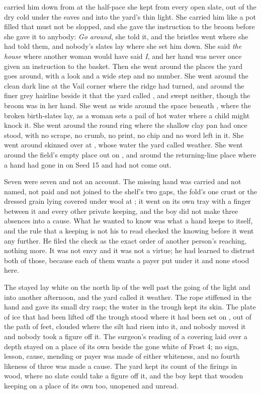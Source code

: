  carried him down from  at the half-pace she kept from every open slate, out of the dry cold under the eaves and into the yard's thin light. She carried him like a pot filled that must not be slopped, and she gave the instruction to the broom before she gave it to anybody: \emph{Go around}, she told it, and the bristles went where she had told them, and nobody's slates lay where she set him down. She said \emph{the house} where another woman would have said \emph{I}, and her hand was never once given an instruction to the basket. Then she went around the places the yard goes around, with a look and a wide step and no number. She went around the clean dark line at the Vail corner where the  ridge had turned, and around the finer grey hairline beside it that the yard called , and swept neither, though the broom was in her hand. She went as wide around the space beneath , where the broken birth-slates lay, as a woman sets a pail of hot water where a child might knock it. She went around the round ring where the shallow clay pan had once stood, with no scrape, no crumb, no print, no chip and no word left in it. She went around  skinned over at , whose water the yard called weather. She went around the field's empty place out on , and around the returning-line place where a hand had gone in on Seed 15 and had not come out.

Seven were seven and not an account. The missing hand was carried and not named, not paid and not joined to the shelf's two gaps, the fold's one crust or the dressed grain lying covered under wool at ; it went on its own tray with a finger between it and every other private keeping, and the boy did not make three absences into a cause. What he wanted to know was what a hand keeps to itself, and the rule that a keeping is not his to read checked the knowing before it went any further. He filed the check as the exact order of another person's reaching, nothing more. It was not envy and it was not a virtue; he had learned to distrust both of those, because each of them wants a payer put under it and none stood here.

The stayed  lay white on the north lip of the well past the going of the light and into another afternoon, and the yard called it weather. The rope stiffened in the hand and gave its small dry rasp; the water in the trough kept its skin. The plate of ice that had been lifted off the trough stood where it had been set on , out of the path of feet, clouded where the silt had risen into it, and nobody moved it and nobody took a figure off it. The surgeon's reading of a covering laid over a depth stayed on a place of its own beside the gone white of Frost 4; no sign, lesson, cause, mending or payer was made of either whiteness, and no fourth likeness of three was made a cause. The yard kept its count of the firings in wood, where no slate could take a figure off it, and the boy kept that wooden keeping on a place of its own too, unopened and unread.

